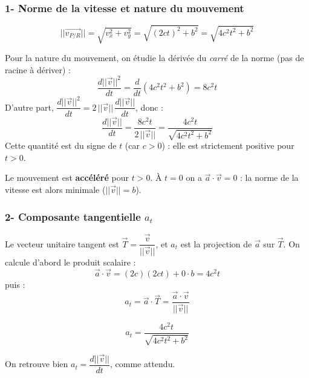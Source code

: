 \documentclass[11pt,a4paper]{article}
\begin{document}
\subsubsection*{1- Norme de la vitesse et nature du mouvement}
\begin{sonucbox}
$$ ||\vec{v_{P/R}}|| = \sqrt{v_x^2 + v_y^2} = \sqrt{(2ct)^2 + b^2} = \sqrt{4c^2t^2 + b^2} $$
\end{sonucbox}
Pour la nature du mouvement, on étudie la dérivée du \emph{carré} de la norme (pas de racine à dériver) :
$$ \frac{d||\vec{v}||^2}{dt} = \frac{d}{dt}\left(4c^2t^2 + b^2\right) = 8c^2t $$
D'autre part, $\dfrac{d||\vec{v}||^2}{dt} = 2\,||\vec{v}||\,\dfrac{d||\vec{v}||}{dt}$, donc :
$$ \frac{d||\vec{v}||}{dt} = \frac{8c^2t}{2\,||\vec{v}||} = \frac{4c^2t}{\sqrt{4c^2t^2 + b^2}} $$
Cette quantité est du signe de $t$ (car $c>0$) : elle est strictement positive pour $t>0$.
\begin{sonucbox}
Le mouvement est \textbf{accéléré} pour $t>0$. À $t=0$ on a $\vec{a}\cdot\vec{v}=0$ : la norme de la vitesse est alors minimale ($||\vec{v}||=b$).
\end{sonucbox}

\subsubsection*{2- Composante tangentielle $a_t$}
Le vecteur unitaire tangent est $\vec{T} = \dfrac{\vec{v}}{||\vec{v}||}$, et $a_t$ est la projection de $\vec{a}$ sur $\vec{T}$. On calcule d'abord le produit scalaire :
$$ \vec{a}\cdot\vec{v} = (2c)(2ct) + 0\cdot b = 4c^2t $$
puis :
$$ a_t = \vec{a}\cdot\vec{T} = \frac{\vec{a}\cdot\vec{v}}{||\vec{v}||} $$
\begin{sonucbox}
$$ a_t = \frac{4c^2t}{\sqrt{4c^2t^2 + b^2}} $$
\end{sonucbox}
On retrouve bien $a_t = \dfrac{d||\vec{v}||}{dt}$, comme attendu.
\end{document}
